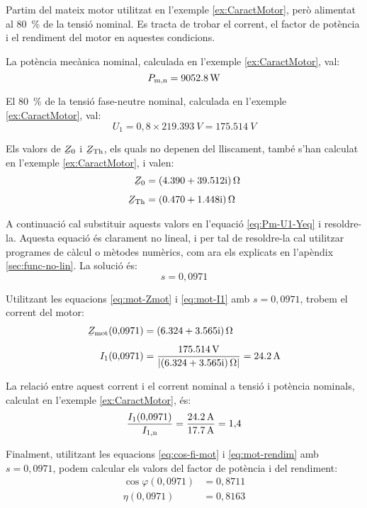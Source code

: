 	
\begin{exemple}\label{ex:MotTensRedSolAp}
	\addcontentsxms{\MotTensRedSolAp}	
	Partim del mateix motor utilitzat en l'exemple \vref{ex:CaractMotor}, però alimentat al \qty{80}{\%} de la tensió nominal. Es tracta de trobar el corrent, el factor de potència i el rendiment del motor en aquestes condicions.
	
	La potència mecànica nominal, calculada  en l'exemple \ref{ex:CaractMotor}, val: \[
	P_\mathrm{m,n} = \qty{9052,8}{W}
	\]
	
	El \qty{80}{\%} de la tensió fase-neutre nominal, calculada  en l'exemple \ref{ex:CaractMotor}, val:
	\[
	U_1 = 0{,}8\times\qty{219,393}{V} = \qty{175,514}{V}
	\]
	
	Els valors de $\cmplx{Z}_0$ i  $\cmplx{Z}\ped{Th}$, els quals no depenen del lliscament, també s'han calculat en  l'exemple \ref{ex:CaractMotor}, i valen:
	\begin{align*}
	\cmplx{Z}_0 &=  \complexqty{4,390+j39,512}{\ohm} \\[1ex]
	\cmplx{Z}\ped{Th} &= \complexqty{0,470+j1,448}{\ohm} 
	\end{align*}
	
	A continuació cal substituir aquests valors en l'equació \eqref{eq:Pm-U1-Yeq} i resoldre-la. Aquesta equació és clarament no lineal, i per tal de resoldre-la cal utilitzar programes de càlcul o mètodes numèrics, com ara els explicats en l'apèndix \ref{sec:func-no-lin}. La solució és:
	\[
	s = 0{,}0971
	\]
	
	Utilitzant les equacions \eqref{eq:mot-Zmot} i \eqref{eq:mot-I1} amb $s  = 0{,}0971$, trobem el corrent del motor:
	\begin{align*}
	\cmplx{Z}\ped{mot}(0{,}0971) &=  \complexqty{6,324+j3,565}{\ohm} \\[1ex]
	I_1(0{,}0971) &= \frac{\qty{175,514}{V}}{|\complexqty{6,324+j3,565}{\ohm}|} = \qty{24,2}{A}
	\end{align*}
	
	La relació entre aquest  corrent i el corrent nominal a tensió i potència nominals, calculat en l'exemple \ref{ex:CaractMotor}, és:
	\[
	\frac{I_1(0{,}0971)}{I_\mathrm{1,n}} = \frac{\qty{24,2}{A}}{\qty{17,7}{A}} = 1{,}4
	\]
	
	Finalment, utilitzant les equacions  \eqref{eq:cos-fi-mot} i \eqref{eq:mot-rendim} amb $s  = 0{,}0971$, podem calcular els valors del factor de potència i del rendiment:
	\begin{align*}
	\cos\varphi(0{,}0971) &=  0{,}8711 \\
	\eta(0{,}0971) &=  0{,}8163
	\end{align*}
	

\end{exemple}
